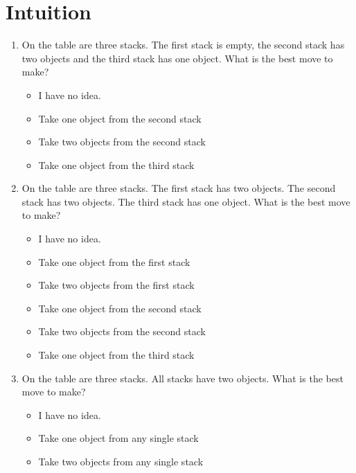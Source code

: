\section{Intuition}
\begin{framed}
\begin{enumerate}
	\item On the table are three stacks. The first stack is empty, the second
		stack has two objects and the third stack has one object. What is the
		best move to make?
		\begin{itemize}
			\item I have no idea.
			\item Take one object from the second stack
			\item Take two objects from the second stack
			\item Take one object from the third stack
		\end{itemize}
	\item On the table are three stacks. The first stack has two objects. The
		second stack has two objects. The third stack has one object. What is
		the best move to make?
		\begin{itemize}
			\item I have no idea.
			\item Take one object from the first stack
			\item Take two objects from the first stack
			\item Take one object from the second stack
			\item Take two objects from the second stack
			\item Take one object from the third stack
		\end{itemize}
	\item On the table are three stacks. All stacks have two objects. What is
		the best move to make?
		\begin{itemize}
			\item I have no idea.
			\item Take one object from any single stack
			\item Take two objects from any single stack
		\end{itemize}
\end{enumerate}
\end{framed}
